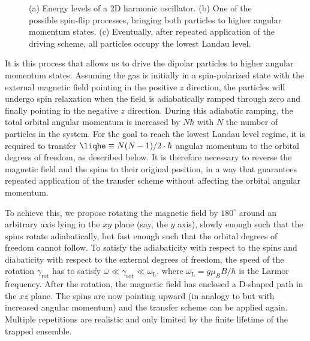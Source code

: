 \begin{figure}[t]
    \centering
    \caption{(a) Energy levels of a 2D harmonic oscillator. (b) One of the possible spin-flip processes, bringing both particles to higher angular momentum states. (c) Eventually, after repeated application of the driving scheme, all particles occupy the lowest Landau level.}
\end{figure}

It is this process that allows us to drive the dipolar particles to higher angular momentum states. Assuming the gas is initially in a spin-polarized state with the external magnetic field pointing in the positive $z$ direction, the particles will undergo spin relaxation when the field is adiabatically ramped through zero and finally pointing in the negative $z$ direction. During this adiabatic ramping,
the total orbital angular momentum is increased by $N\hbar$ with $N$ the number of particles in the system.  For the goal to reach the lowest Landau level regime, it is required to transfer  $\liqhe\equiv N(N-1)/2 \cdot \hbar$ angular momentum to the orbital degrees of freedom, as described below. It is therefore necessary to reverse the magnetic field and the spins to their original position, in a way that guarantees repeated application of the transfer scheme without affecting the orbital angular momentum.

To achieve this, we propose rotating the magnetic field by $180^\circ$ around an arbitrary axis lying in the $xy$ plane (say, the $y$ axis), slowly enough such that the spins rotate adiabatically, but fast enough such that the orbital degrees of freedom cannot follow. To satisfy the adiabaticity with respect to the spins and diabaticity with respect to the external degrees of freedom, the speed of the rotation $\gamma_\text{rot}$ has to satisfy
$\omega \ll \gamma_\text{rot} \ll \omega_\text{L}$, where $\omega_\text{L}=g\mu_B B/\hbar$ is the Larmor frequency. After the rotation, the magnetic field has enclosed a \textsf{D}-shaped path in the $xz$ plane. The spins are now pointing upward (in analogy to  but with
increased angular momentum) and the transfer scheme can be applied again. Multiple repetitions are realistic and only limited by the finite lifetime of the trapped ensemble.

